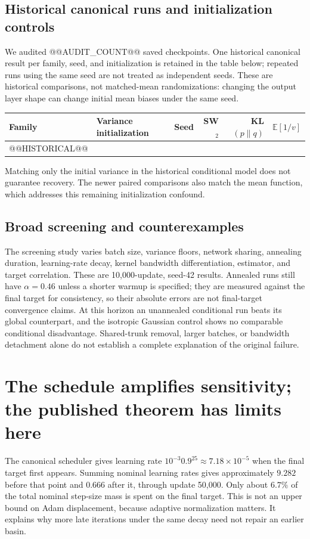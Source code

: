 \documentclass[11pt,a4paper]{article}
\numberwithin{equation}{section}
\newcommand{\E}{\mathbb E}
\begin{document}
\subsection{Historical canonical runs and initialization controls}
We audited @@AUDIT_COUNT@@ saved checkpoints. One historical canonical
result per family, seed, and initialization is retained in the table below;
repeated runs using the same seed are not treated as independent seeds.
These are historical comparisons, not matched-mean randomizations: changing
the output layer shape can change initial mean biases under the same seed.
\begin{center}\small
\begin{tabular}{llrrrr}\toprule
Family & Variance initialization & Seed & SW$_2$ & KL$(p\|q)$ & $\E[1/v]$\\\midrule
@@HISTORICAL@@
\bottomrule\end{tabular}
\end{center}
Matching only the initial variance in the historical conditional model does
not guarantee recovery. The newer paired comparisons also match the mean
function, which addresses this remaining initialization confound.

\subsection{Broad screening and counterexamples}
The screening study varies batch size, variance floors, network sharing,
annealing duration, learning-rate decay, kernel bandwidth differentiation,
estimator, and target correlation. These are 10,000-update, seed-42 results.
Annealed runs still have $\alpha=0.46$ unless a shorter warmup is specified;
they are measured against the final target for consistency, so their absolute
errors are not final-target convergence claims. At this horizon an unannealed
conditional run beats its global counterpart, and the isotropic Gaussian
control shows no comparable conditional disadvantage. Shared-trunk removal,
larger batches, or bandwidth detachment alone do not establish a complete
explanation of the original failure.

\section{The schedule amplifies sensitivity; the published theorem has limits here}
The canonical scheduler gives learning rate $10^{-3}0.9^{25}\approx
7.18\times10^{-5}$ when the final target first appears. Summing nominal
learning rates gives approximately $9.282$ before that point and $0.666$
after it, through update 50,000. Only about $6.7\%$ of the total nominal
step-size mass is spent on the final target. This is not an upper bound on
Adam displacement, because adaptive normalization matters. It explains why
more late iterations under the same decay need not repair an earlier basin.
\end{document}
